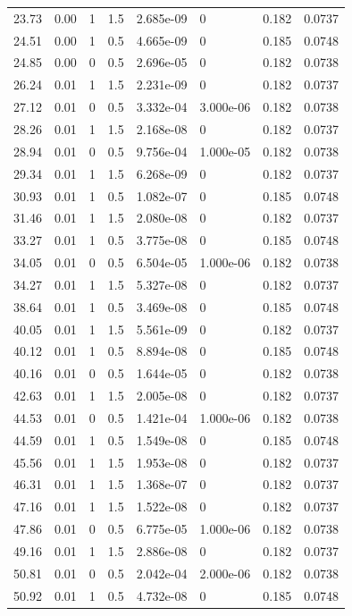 \documentclass[preview]{standalone}
\begin{document}
{{\begin{tabular}{L{1.2cm}C{1.2cm} C{0.3cm}C{0.5cm} C{1.4cm}C{1.4cm} C{1.4cm}C{1.4cm}}
  23.73  &  0.00  & 1     & 1.5 &  2.685e-09  & 0  & 0.182 &  0.0737   \\ 
  24.51  &  0.00  & 1     & 0.5 &  4.665e-09  & 0  & 0.185 &  0.0748   \\ 
  24.85  &  0.00  & 0     & 0.5 &  2.696e-05  & 0  & 0.182 &  0.0738   \\ 
  26.24  &  0.01  & 1     & 1.5 &  2.231e-09  & 0  & 0.182 &  0.0737   \\ 
  27.12  &  0.01  & 0     & 0.5 &  3.332e-04  & 3.000e-06  & 0.182 &  0.0738   \\ 
  28.26  &  0.01  & 1     & 1.5 &  2.168e-08  & 0  & 0.182 &  0.0737   \\ 
  28.94  &  0.01  & 0     & 0.5 &  9.756e-04  & 1.000e-05  & 0.182 &  0.0738   \\ 
  29.34  &  0.01  & 1     & 1.5 &  6.268e-09  & 0  & 0.182 &  0.0737   \\ 
  30.93  &  0.01  & 1     & 0.5 &  1.082e-07  & 0  & 0.185 &  0.0748   \\ 
  31.46  &  0.01  & 1     & 1.5 &  2.080e-08  & 0  & 0.182 &  0.0737   \\ 
  33.27  &  0.01  & 1     & 0.5 &  3.775e-08  & 0  & 0.185 &  0.0748   \\ 
  34.05  &  0.01  & 0     & 0.5 &  6.504e-05  & 1.000e-06  & 0.182 &  0.0738   \\ 
  34.27  &  0.01  & 1     & 1.5 &  5.327e-08  & 0  & 0.182 &  0.0737   \\ 
  38.64  &  0.01  & 1     & 0.5 &  3.469e-08  & 0  & 0.185 &  0.0748   \\ 
  40.05  &  0.01  & 1     & 1.5 &  5.561e-09  & 0  & 0.182 &  0.0737   \\ 
  40.12  &  0.01  & 1     & 0.5 &  8.894e-08  & 0  & 0.185 &  0.0748   \\ 
  40.16  &  0.01  & 0     & 0.5 &  1.644e-05  & 0  & 0.182 &  0.0738   \\ 
  42.63  &  0.01  & 1     & 1.5 &  2.005e-08  & 0  & 0.182 &  0.0737   \\ 
  44.53  &  0.01  & 0     & 0.5 &  1.421e-04  & 1.000e-06  & 0.182 &  0.0738   \\ 
  44.59  &  0.01  & 1     & 0.5 &  1.549e-08  & 0  & 0.185 &  0.0748   \\ 
  45.56  &  0.01  & 1     & 1.5 &  1.953e-08  & 0  & 0.182 &  0.0737   \\ 
  46.31  &  0.01  & 1     & 1.5 &  1.368e-07  & 0  & 0.182 &  0.0737   \\ 
  47.16  &  0.01  & 1     & 1.5 &  1.522e-08  & 0  & 0.182 &  0.0737   \\ 
  47.86  &  0.01  & 0     & 0.5 &  6.775e-05  & 1.000e-06  & 0.182 &  0.0738   \\ 
  49.16  &  0.01  & 1     & 1.5 &  2.886e-08  & 0  & 0.182 &  0.0737   \\ 
  50.81  &  0.01  & 0     & 0.5 &  2.042e-04  & 2.000e-06  & 0.182 &  0.0738   \\ 
  50.92  &  0.01  & 1     & 0.5 &  4.732e-08  & 0  & 0.185 &  0.0748   \\ 
\hline 
\end{tabular} 

}}
\end{document}

